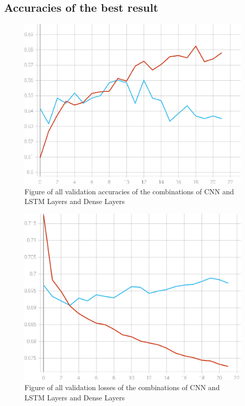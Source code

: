 \subsection{Accuracies of the best result}
\begin{figure}[ht]
    \centering
    \includegraphics[width=0.95\columnwidth]{figures/results/cnn_iteration2_1c32_1d32_accuracy.eps}
    \caption[Figure of accuracies and losses for Iteration 3]{Figure of all validation accuracies of the combinations of CNN and LSTM Layers and Dense Layers}
    \label{fig:iteration3_best_accuracy}
\end{figure}
\FloatBarrier
\begin{figure}[ht]
    \centering
    \includegraphics[width=0.95\columnwidth]{figures/results/cnn_iteration2_1c32_1d32_loss.eps}
    \caption[Figure of accuracies and losses for Iteration 3]{Figure of all validation losses of the combinations of CNN and LSTM Layers and Dense Layers}
    \label{fig:iteration3_best_loss}
\end{figure}
\FloatBarrier